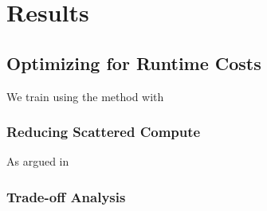 \documentclass[../main.tex]{subfiles}
\begin{document}
    \chapter{Results}\label{ch:results}

    \section{Optimizing for Runtime Costs}\label{sec:optimizing-for-runtime}
    We train using the method with

    \subsection{Reducing Scattered Compute}\label{subsec:reducing-scattered-compute}
    As argued in

    \begin{table}
        \centering
        \caption{Comparing compute time on CPU and GPU using }
        \label{tab:reducing-scattering}
%
    \end{table}




    \subsection{Trade-off Analysis}\label{subsec:trade-off-analysis}
\end{document}
